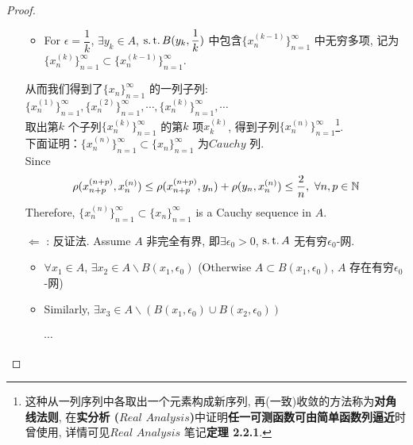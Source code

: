 \begin{thm}
\begin{proof}
\begin{enumerate}
\begin{itemize}
					\item For $\epsilon = \dfrac{1}{k}$, $\exists y_k \in A$, $\operatorname{s.t.} B(y_k , \dfrac{1}{k})$ 中包含$\{ x_{n}^{(k - 1)} \}_{n = 1}^{\infty}$ 中无穷多项, 记为$\{ x_{n}^{(k)} \}_{n = 1}^{\infty} \subset \{ x_{n}^{(k - 1)} \}_{n = 1}^{\infty}$.
				\end{itemize}
				
				\vspace*{1em}
				
				从而我们得到了$\{ x_n \}_{n = 1}^{\infty}$ 的一列子列: $\{ x_{n}^{(1)} \}_{n = 1}^{\infty} , \{ x_{n}^{(2)} \}_{n = 1}^{\infty} , \cdots , \{ x_{n}^{(k)} \}_{n = 1}^{\infty} , \cdots$ \\
				取出第$k$ 个子列$\{ x_{n}^{(k)} \}_{n = 1}^{\infty}$ 的第$k$ 项$x_{k}^{(k)}$, 得到子列$\{ x_{n}^{(n)} \}_{n = 1}^{\infty}$\footnote{这种从一列序列中各取出一个元素构成新序列, 再(一致)收敛的方法称为\textbf{对角线法则}, 在\textbf{实分析 ($Real \,\, Analysis$)}中证明\textbf{任一可测函数可由简单函数列逼近}时曾使用, 详情可见$Real \,\, Analysis$ 笔记\textbf{定理 2.2.1}.}. \\
				下面证明：$\{ x_{n}^{(n)} \}_{n = 1}^{\infty} \subset \{ x_n \}_{n = 1}^{\infty}$ 为$Cauchy$ 列.\\
				Since
				\begin{align}
					\rho(x_{n + p}^{(n + p)} , x_{n}^{(n)}) 
					\leq \rho(x_{n + p}^{(n + p)} , y_n) + \rho(y_n , x_{n}^{(n)}) 
					\leq \frac{2}{n} , \,\, \forall n , p \in \mathbb{N}
				\end{align}
				Therefore, $\{ x_{n}^{(n)} \}_{n = 1}^{\infty} \subset \{ x_n \}_{n = 1}^{\infty}$ is a Cauchy sequence in $A$.
				
				\newpage
				
				\item[$\Leftarrow$]: 反证法. Assume $A$ 非完全有界, 即$\exists \epsilon_0 > 0$, $\operatorname{s.t.} A$ 无有穷$\epsilon_0$-网.  
				
				\vspace*{1em}
				
				\begin{itemize}
					\item $\forall x_1 \in A$, $\exists x_2 \in A \backslash B(x_1 , \epsilon_0)$ (Otherwise $A \subset B(x_1 , \epsilon_0)$, $A$ 存在有穷$\epsilon_0$-网)
					
					\item Similarly, $\exists x_3 \in A \backslash \left( B(x_1 , \epsilon_0) \cup B(x_2 , \epsilon_0) \right)$
					
					\begin{center}
						$\cdots$
					\end{center}
				

\end{itemize}
\end{enumerate}
\end{proof}
\end{thm}
